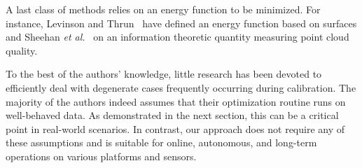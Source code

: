 A last class of methods relies on an energy function to be minimized. For
instance, Levinson and Thrun~\cite{levinson10unsupervised} have defined an
energy function based on surfaces and Sheehan \emph{et al.}~\cite{sheehan12self}
on an information theoretic quantity measuring point cloud quality.

To the best of the authors' knowledge, little research has been devoted to
efficiently deal with degenerate cases frequently occurring during calibration.
The majority of the authors indeed assumes that their optimization routine runs
on well-behaved data. As demonstrated in the next section, this can be a
critical point in real-world scenarios. In contrast, our approach does not
require any of these assumptions and is suitable for online, autonomous, and
long-term operations on various platforms and sensors.
